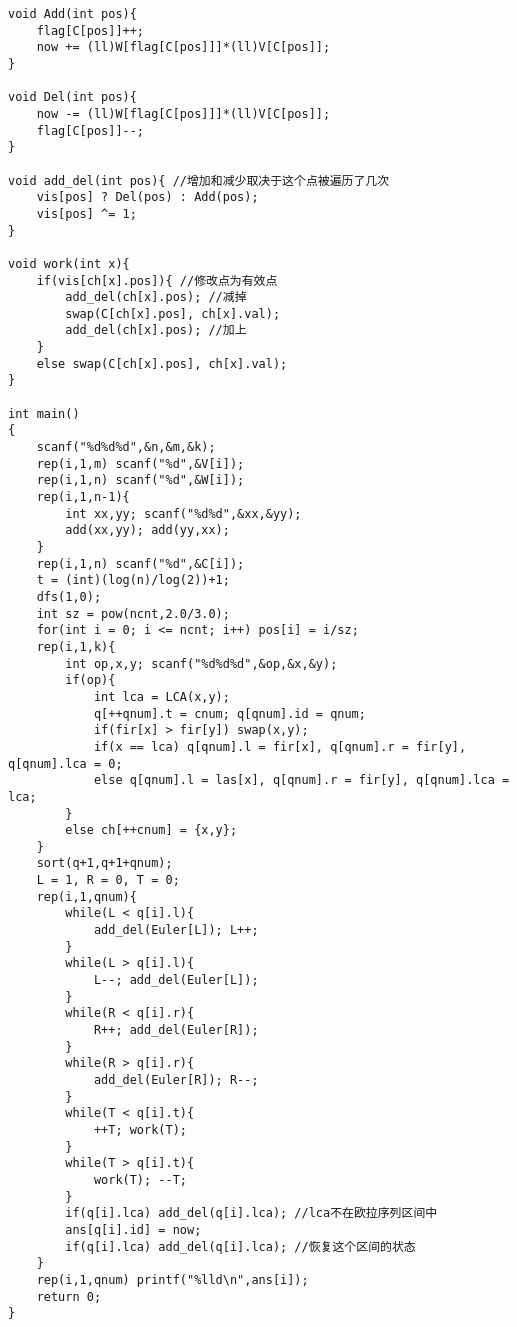 \documentclass[twoside]{article}
\begin{document}
\begin{lstlisting}
void Add(int pos){
	flag[C[pos]]++;
	now += (ll)W[flag[C[pos]]]*(ll)V[C[pos]];
}

void Del(int pos){
	now -= (ll)W[flag[C[pos]]]*(ll)V[C[pos]];
	flag[C[pos]]--;
}

void add_del(int pos){ //增加和减少取决于这个点被遍历了几次
	vis[pos] ? Del(pos) : Add(pos);
	vis[pos] ^= 1;
}

void work(int x){
	if(vis[ch[x].pos]){ //修改点为有效点
		add_del(ch[x].pos); //减掉
		swap(C[ch[x].pos], ch[x].val);
		add_del(ch[x].pos); //加上
	}
	else swap(C[ch[x].pos], ch[x].val);
}

int main()
{
	scanf("%d%d%d",&n,&m,&k);
	rep(i,1,m) scanf("%d",&V[i]);
	rep(i,1,n) scanf("%d",&W[i]);
	rep(i,1,n-1){
		int xx,yy; scanf("%d%d",&xx,&yy);
		add(xx,yy); add(yy,xx);
	}
	rep(i,1,n) scanf("%d",&C[i]);
	t = (int)(log(n)/log(2))+1;
	dfs(1,0);
	int sz = pow(ncnt,2.0/3.0);
	for(int i = 0; i <= ncnt; i++) pos[i] = i/sz;
	rep(i,1,k){
		int op,x,y; scanf("%d%d%d",&op,&x,&y);
		if(op){
			int lca = LCA(x,y);
			q[++qnum].t = cnum; q[qnum].id = qnum;
			if(fir[x] > fir[y]) swap(x,y);
			if(x == lca) q[qnum].l = fir[x], q[qnum].r = fir[y], q[qnum].lca = 0;
			else q[qnum].l = las[x], q[qnum].r = fir[y], q[qnum].lca = lca;
		}
		else ch[++cnum] = {x,y};
	}
	sort(q+1,q+1+qnum);
	L = 1, R = 0, T = 0;
	rep(i,1,qnum){
		while(L < q[i].l){
			add_del(Euler[L]); L++;
		}
		while(L > q[i].l){
			L--; add_del(Euler[L]);
		}
		while(R < q[i].r){
			R++; add_del(Euler[R]);
		}
		while(R > q[i].r){
			add_del(Euler[R]); R--;
		}
		while(T < q[i].t){
			++T; work(T);
		}
		while(T > q[i].t){
			work(T); --T;
		}
		if(q[i].lca) add_del(q[i].lca); //lca不在欧拉序列区间中
		ans[q[i].id] = now;
		if(q[i].lca) add_del(q[i].lca); //恢复这个区间的状态
	}
	rep(i,1,qnum) printf("%lld\n",ans[i]);
	return 0;
}\end{lstlisting}
\end{document}
